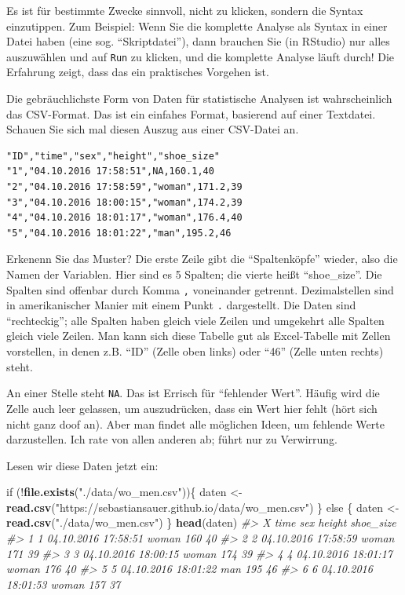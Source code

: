 \documentclass[12pt,]{book}
\newenvironment{Shaded}{\begin{snugshade}}{\end{snugshade}}
\newcommand{\KeywordTok}[1]{\textcolor[rgb]{0.13,0.29,0.53}{\textbf{{#1}}}}
\newcommand{\StringTok}[1]{\textcolor[rgb]{0.31,0.60,0.02}{{#1}}}
\newcommand{\CommentTok}[1]{\textcolor[rgb]{0.56,0.35,0.01}{\textit{{#1}}}}
\newcommand{\NormalTok}[1]{{#1}}
\begin{document}
Es ist für bestimmte Zwecke sinnvoll, nicht zu klicken, sondern die
Syntax einzutippen. Zum Beispiel: Wenn Sie die komplette Analyse als
Syntax in einer Datei haben (eine sog. ``Skriptdatei''), dann brauchen
Sie (in RStudio) nur alles auszuwählen und auf \texttt{Run} zu klicken,
und die komplette Analyse läuft durch! Die Erfahrung zeigt, dass das ein
praktisches Vorgehen ist.

Die gebräuchlichste Form von Daten für statistische Analysen ist
wahrscheinlich das CSV-Format. Das ist ein einfahes Format, basierend
auf einer Textdatei. Schauen Sie sich mal diesen Auszug aus einer
CSV-Datei an.

\begin{verbatim}
"ID","time","sex","height","shoe_size"
"1","04.10.2016 17:58:51",NA,160.1,40
"2","04.10.2016 17:58:59","woman",171.2,39
"3","04.10.2016 18:00:15","woman",174.2,39
"4","04.10.2016 18:01:17","woman",176.4,40
"5","04.10.2016 18:01:22","man",195.2,46
\end{verbatim}

Erkenenn Sie das Muster? Die erste Zeile gibt die ``Spaltenköpfe''
wieder, also die Namen der Variablen. Hier sind es 5 Spalten; die vierte
heißt ``shoe\_size''. Die Spalten sind offenbar durch Komma \texttt{,}
voneinander getrennt. Dezimalstellen sind in amerikanischer Manier mit
einem Punkt \texttt{.} dargestellt. Die Daten sind ``rechteckig''; alle
Spalten haben gleich viele Zeilen und umgekehrt alle Spalten gleich
viele Zeilen. Man kann sich diese Tabelle gut als Excel-Tabelle mit
Zellen vorstellen, in denen z.B. ``ID'' (Zelle oben links) oder ``46''
(Zelle unten rechts) steht.

An einer Stelle steht \texttt{NA}. Das ist Errisch für ``fehlender
Wert''. Häufig wird die Zelle auch leer gelassen, um auszudrücken, dass
ein Wert hier fehlt (hört sich nicht ganz doof an). Aber man findet alle
möglichen Ideen, um fehlende Werte darzustellen. Ich rate von allen
anderen ab; führt nur zu Verwirrung.

Lesen wir diese Daten jetzt ein:

\begin{Shaded}
\begin{Highlighting}[]
\NormalTok{if (!}\KeywordTok{file.exists}\NormalTok{(}\StringTok{"./data/wo_men.csv"}\NormalTok{))\{}
  \NormalTok{daten <-}\StringTok{ }\KeywordTok{read.csv}\NormalTok{(}\StringTok{"https://sebastiansauer.github.io/data/wo_men.csv"}\NormalTok{)}
\NormalTok{\} else \{}
  \NormalTok{daten <-}\StringTok{ }\KeywordTok{read.csv}\NormalTok{(}\StringTok{"./data/wo_men.csv"}\NormalTok{)}
\NormalTok{\}}
\KeywordTok{head}\NormalTok{(daten)}
\CommentTok{#>   X                time   sex height shoe_size}
\CommentTok{#> 1 1 04.10.2016 17:58:51 woman    160        40}
\CommentTok{#> 2 2 04.10.2016 17:58:59 woman    171        39}
\CommentTok{#> 3 3 04.10.2016 18:00:15 woman    174        39}
\CommentTok{#> 4 4 04.10.2016 18:01:17 woman    176        40}
\CommentTok{#> 5 5 04.10.2016 18:01:22   man    195        46}
\CommentTok{#> 6 6 04.10.2016 18:01:53 woman    157        37}
\end{Highlighting}
\end{Shaded}
\end{document}

